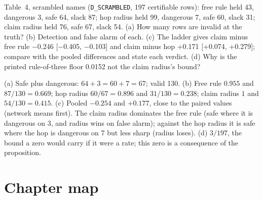 \begin{exercicio}[metodo=table-reading,conceito=baldes]
Table~4, scrambled names (\texttt{D\_SCRAMBLED}, 197 certifiable rows): free rule held 43, dangerous 3,
safe 64, slack 87; hop radius held 99, dangerous 7, safe 60, slack 31; claim radius held 76, safe 67,
slack 54. (a) How many rows are invalid at the truth? (b) Detection and false alarm of each. (c) The
ladder gives claim minus free rule $-$0.246 [$-$0.405, $-$0.103] and claim minus hop +0.171 [+0.074,
+0.279]; compare with the pooled differences and state each verdict. (d) Why is the printed
rule-of-three floor 0.0152 not the claim radius's bound?
\end{exercicio}
\begin{solucao}
(a) Safe plus dangerous: $64 + 3 = 60 + 7 = 67$; valid 130. (b) Free rule $0.955$ and $87/130 = 0.669$;
hop radius $60/67 = 0.896$ and $31/130 = 0.238$; claim radius $1$ and $54/130 = 0.415$. (c) Pooled
$-0.254$ and $+0.177$, close to the paired values (network means first). The claim radius
dominates the free rule (safe where it is dangerous on 3, and radius wins on false alarm); against the
hop
radius it is safe where the hop is dangerous on 7 but less sharp (radius loses). (d) $3/197$, the
bound a
zero would carry if it were a rate; this zero is a consequence of the proposition.
\end{solucao}

\section*{Chapter map}

\begin{center}
\end{center}

